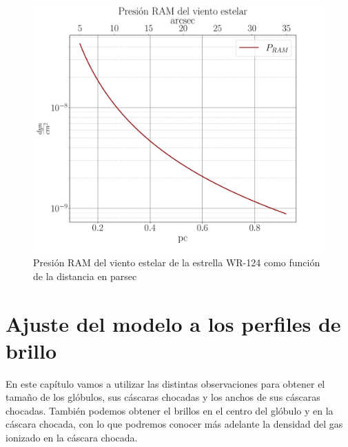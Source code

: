 \documentclass{book}
\begin{document}
\begin{figure}[htb]
    \centering    \includegraphics[width=\textwidth]{Nuevas imagenes finales/PRAMcgs.pdf}
    \caption{Presión RAM del viento estelar de la estrella WR-124 como función de la distancia en parsec}
    \label{P_RAM}
\end{figure}

\chapter{Ajuste del modelo a los perfiles de brillo}\label{Chapter : Ajuste}

En este capítulo vamos a utilizar las distintas observaciones para obtener el tamaño de los glóbulos, sus cáscaras chocadas y los anchos de sus cáscaras chocadas. También podemos obtener el brillos en el centro del glóbulo y en la cáscara chocada, con lo que podremos conocer más adelante la densidad del gas ionizado en la cáscara chocada.
\end{document}
